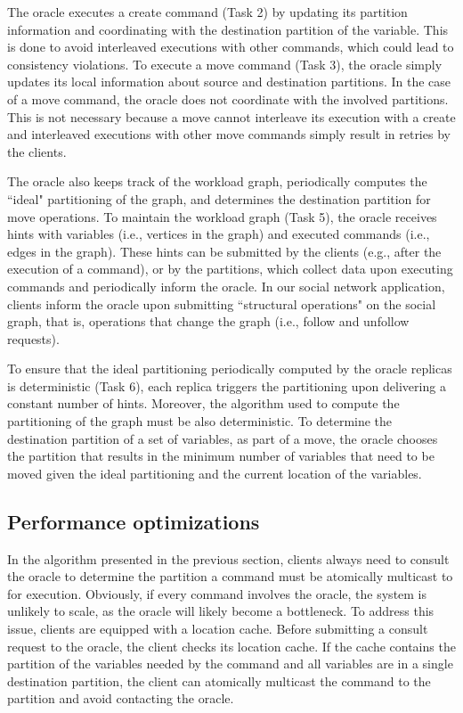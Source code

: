 The oracle executes a create command (Task 2) by updating its partition information and coordinating with the destination partition of the variable.
This is done to avoid interleaved executions with other commands, which could lead to consistency violations. 
To execute a move command (Task 3), the oracle simply updates its local information about source and destination partitions.
In the case of a move command, the oracle does not coordinate with the involved partitions.
This is not necessary because a move cannot interleave its execution with a create and interleaved executions with other move commands simply result in retries by the clients.

The oracle also keeps track of the workload graph, periodically computes the ``ideal" partitioning of the graph, and determines the destination partition for move operations.
To maintain the workload graph (Task 5), the oracle receives hints with variables (i.e., vertices in the graph) and executed commands (i.e., edges in the graph).
These hints can be submitted by the clients (e.g., after the execution of a command), or by the partitions, which collect data upon executing commands and periodically inform the oracle.
In our social network application, clients inform the oracle upon submitting ``structural operations" on the social graph, that is, operations that change the  graph (i.e., follow and unfollow requests).

To ensure that the ideal partitioning periodically computed by the oracle replicas is deterministic (Task 6), each replica triggers the partitioning upon delivering a constant number of hints.
Moreover, the algorithm used to compute the partitioning of the graph must be also deterministic.
To determine the destination partition of a set of variables, as part of a move, the oracle chooses the partition that results in the minimum number of variables that need to be moved given the ideal partitioning and the current location of the variables.

\subsection{Performance optimizations}
\label{sec:optm}

In the algorithm presented in the previous section, clients always need to consult the oracle to determine the partition a command must be atomically multicast to for execution.
Obviously, if every command involves the oracle, the system is unlikely to scale, as the oracle will likely become a bottleneck.
To address this issue, clients are equipped with a location cache.
Before submitting a consult request to the oracle, the client checks its location cache.
If the cache contains the partition of the variables needed by the command and all variables are in a single destination partition, the client can atomically multicast the command to the partition and avoid contacting the oracle. 

